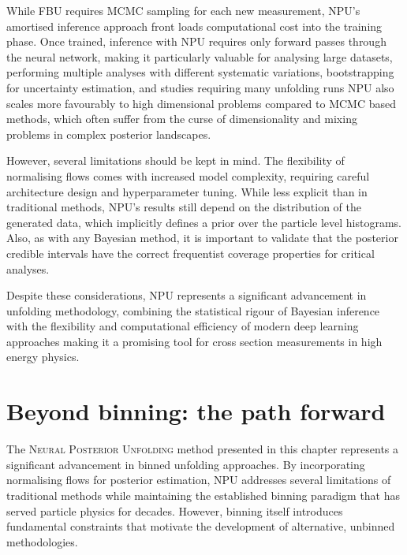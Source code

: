     While FBU requires MCMC sampling for each new measurement, NPU's amortised inference approach front loads computational cost into the training phase.
    Once trained, inference with NPU requires only forward passes through the neural network, making it particularly valuable for analysing large datasets, performing multiple analyses with different systematic variations, bootstrapping for uncertainty estimation, and studies requiring many unfolding runs
    NPU also scales more favourably to high dimensional problems compared to MCMC based methods, which often suffer from the curse of dimensionality and mixing problems in complex posterior landscapes.
    
    However, several limitations should be kept in mind.
    The flexibility of normalising flows comes with increased model complexity, requiring careful architecture design and hyperparameter tuning.
    While less explicit than in traditional methods, NPU's results still depend on the distribution of the generated data, which implicitly defines a prior over the particle level histograms.
    Also, as with any Bayesian method, it is important to validate that the posterior credible intervals have the correct frequentist coverage properties for critical analyses.
    
    Despite these considerations, NPU represents a significant advancement in unfolding methodology, combining the statistical rigour of Bayesian inference with the flexibility and computational efficiency of modern deep learning approaches making it a promising tool for cross section measurements in high energy physics.

\section{Beyond binning: the path forward}
    The \textsc{Neural Posterior Unfolding} method presented in this chapter represents a significant advancement in binned unfolding approaches.
    By incorporating normalising flows for posterior estimation, NPU addresses several limitations of traditional methods while maintaining the established binning paradigm that has served particle physics for decades.
    However, binning itself introduces fundamental constraints that motivate the development of alternative, unbinned methodologies.

